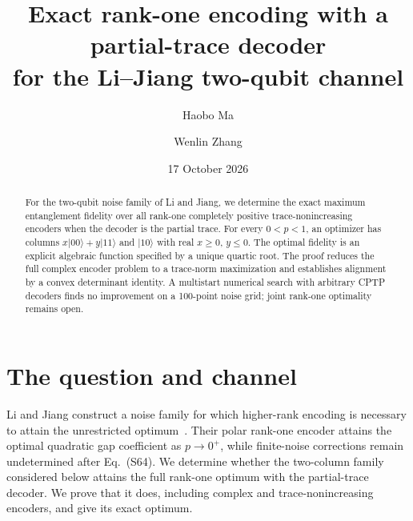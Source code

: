 \documentclass[11pt]{article}
\title{Exact rank-one encoding with a partial-trace decoder\\for the Li--Jiang two-qubit channel}
\author{Haobo Ma \and Wenlin Zhang}
\date{17 October 2026}
\newcommand{\ket}[1]{\lvert #1\rangle}
\begin{document}
\maketitle
\begin{abstract}
For the two-qubit noise family of Li and Jiang, we determine the exact maximum
entanglement fidelity over all rank-one completely positive trace-nonincreasing
encoders when the decoder is the partial trace. For every $0<p<1$, an optimizer
has columns $x\ket{00}+y\ket{11}$ and $\ket{10}$ with real $x\geq0$, $y\leq0$.
The optimal fidelity is an explicit algebraic function specified by a unique
quartic root. The proof reduces the full complex encoder problem to a trace-norm
maximization and establishes alignment by a convex determinant identity.
A multistart numerical search with arbitrary CPTP decoders finds no improvement
on a 100-point noise grid; joint rank-one optimality remains open.
\end{abstract}

\section{The question and channel}
Li and Jiang construct a noise family for which higher-rank encoding is
necessary to attain the unrestricted optimum~\cite{LiJiang}.
Their polar rank-one encoder attains the optimal quadratic gap coefficient
as $p\to0^+$, while finite-noise corrections remain undetermined after
Eq.~(S64). We determine whether the two-column family considered below
attains the full rank-one optimum with the partial-trace decoder.
We prove that it does, including
complex and trace-nonincreasing encoders, and give its exact optimum.
\end{document}
